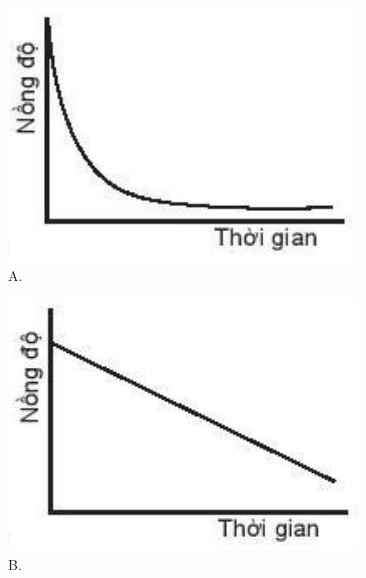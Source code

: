 \documentclass[10pt]{article}
\begin{document}
\begin{figure}[h]
\begin{center}
\captionsetup{labelformat=empty}
\caption{A.}
  \includegraphics[width=\textwidth]{2025_10_23_883c4b146e2332109fcdg-58(3)}
\end{center}
\end{figure}

\begin{figure}[h]
\begin{center}
\captionsetup{labelformat=empty}
\caption{B.}
  \includegraphics[width=\textwidth]{2025_10_23_883c4b146e2332109fcdg-58}
\end{center}
\end{figure}
\end{document}
